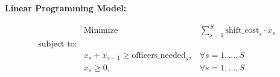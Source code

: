 \documentclass{article}
\begin{document}
\textbf{Linear Programming Model:}

\begin{align*}
& \text{Minimize } & \sum_{s=1}^{S} \text{shift\_cost}_{s} \cdot x_{s} \\
\text{subject to:} & \\
& x_{s} + x_{s-1} \geq \text{officers\_needed}_{s}, & \forall s = 1, \ldots, S \\
& x_{s} \geq 0, & \forall s = 1, \ldots, S \\
\end{align*}
\end{document}
